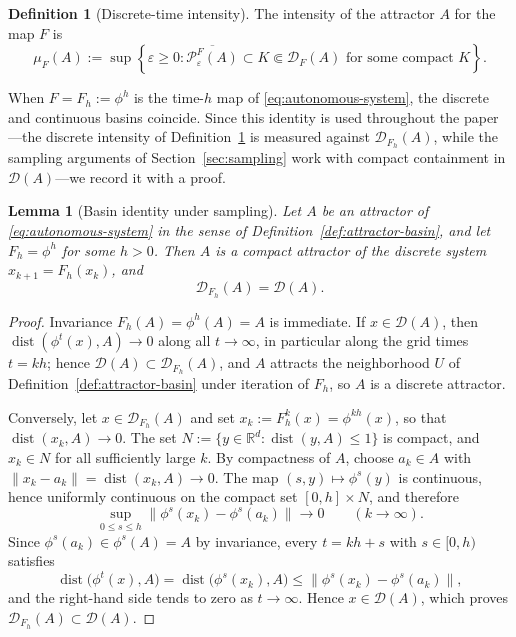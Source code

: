 \documentclass[pdflatex,sn-mathphys-num]{sn-jnl}
\numberwithin{equation}{section}
\theoremstyle{thmstyleone}%
\newtheorem{lemma}[theorem]{Lemma}
\theoremstyle{definition}
\newtheorem{definition}[theorem]{Definition}
\theoremstyle{remark}
\begin{document}
\begin{definition}[Discrete-time intensity]
\label{def:discrete-intensity}
The intensity of the attractor $A$ for the map $F$ is
\[
    \mu_F(A)
    :=
    \sup\left\{
    \varepsilon\geq0:
    \overline{\mathcal P_\varepsilon^F(A)}
    \subset K\Subset\mathcal D_F(A)
    \text{ for some compact }K
    \right\}.
\]
\end{definition}

When $F=F_h:=\phi^h$ is the time-$h$ map of \eqref{eq:autonomous-system}, the discrete and continuous basins coincide. Since this identity is used throughout the paper---the discrete intensity of Definition~\ref{def:discrete-intensity} is measured against $\mathcal D_{F_h}(A)$, while the sampling arguments of Section~\ref{sec:sampling} work with compact containment in $\mathcal D(A)$---we record it with a proof.

\begin{lemma}[Basin identity under sampling]
\label{lem:basin-identity}
Let $A$ be an attractor of \eqref{eq:autonomous-system} in the sense of Definition~\ref{def:attractor-basin}, and let $F_h=\phi^h$ for some $h>0$. Then $A$ is a compact attractor of the discrete system $x_{k+1}=F_h(x_k)$, and
\begin{equation}
\label{eq:basin-identity}
    \mathcal D_{F_h}(A)=\mathcal D(A).
\end{equation}
\end{lemma}

\begin{proof}
Invariance $F_h(A)=\phi^h(A)=A$ is immediate. If $x\in\mathcal D(A)$, then $\operatorname{dist}(\phi^t(x),A)\to0$ along all $t\to\infty$, in particular along the grid times $t=kh$; hence $\mathcal D(A)\subset\mathcal D_{F_h}(A)$, and $A$ attracts the neighborhood $U$ of Definition~\ref{def:attractor-basin} under iteration of $F_h$, so $A$ is a discrete attractor.

Conversely, let $x\in\mathcal D_{F_h}(A)$ and set $x_k:=F_h^k(x)=\phi^{kh}(x)$, so that $\operatorname{dist}(x_k,A)\to0$. The set $N:=\{y\in\mathbb R^d:\operatorname{dist}(y,A)\leq1\}$ is compact, and $x_k\in N$ for all sufficiently large $k$. By compactness of $A$, choose $a_k\in A$ with $\|x_k-a_k\|=\operatorname{dist}(x_k,A)\to0$. The map $(s,y)\mapsto\phi^s(y)$ is continuous, hence uniformly continuous on the compact set $[0,h]\times N$, and therefore
\[
    \sup_{0\leq s\leq h}
    \bigl\|\phi^s(x_k)-\phi^s(a_k)\bigr\|
    \longrightarrow0
    \qquad(k\to\infty).
\]
Since $\phi^s(a_k)\in\phi^s(A)=A$ by invariance, every $t=kh+s$ with $s\in[0,h)$ satisfies
\[
    \operatorname{dist}\bigl(\phi^t(x),A\bigr)
    =
    \operatorname{dist}\bigl(\phi^s(x_k),A\bigr)
    \leq
    \bigl\|\phi^s(x_k)-\phi^s(a_k)\bigr\|,
\]
and the right-hand side tends to zero as $t\to\infty$. Hence $x\in\mathcal D(A)$, which proves $\mathcal D_{F_h}(A)\subset\mathcal D(A)$.
\end{proof}
\end{document}
